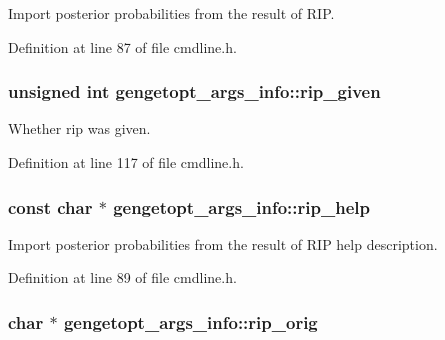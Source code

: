 Import posterior probabilities from the result of R\+I\+P. 



Definition at line 87 of file cmdline.\+h.

\hypertarget{structgengetopt__args__info_ac307b1ec217df5ef31616c14a77627b3}{
\subsubsection[{rip\+\_\+given}]{\setlength{\rightskip}{0pt plus 5cm}unsigned int gengetopt\+\_\+args\+\_\+info\+::rip\+\_\+given}}\label{structgengetopt__args__info_ac307b1ec217df5ef31616c14a77627b3}


Whether rip was given. 



Definition at line 117 of file cmdline.\+h.

\hypertarget{structgengetopt__args__info_a41b61f6fe469c862d765c45879591857}{
\subsubsection[{rip\+\_\+help}]{\setlength{\rightskip}{0pt plus 5cm}const char $\ast$ gengetopt\+\_\+args\+\_\+info\+::rip\+\_\+help}}\label{structgengetopt__args__info_a41b61f6fe469c862d765c45879591857}


Import posterior probabilities from the result of R\+I\+P help description. 



Definition at line 89 of file cmdline.\+h.

\hypertarget{structgengetopt__args__info_a152b3fd65570a82ac6effec4c8f78317}{
\subsubsection[{rip\+\_\+orig}]{\setlength{\rightskip}{0pt plus 5cm}char $\ast$ gengetopt\+\_\+args\+\_\+info\+::rip\+\_\+orig}}\label{structgengetopt__args__info_a152b3fd65570a82ac6effec4c8f78317}


